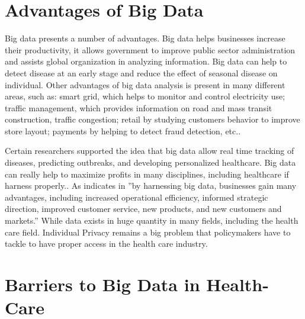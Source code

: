 \documentclass[sigconf]{acmart}
\begin{document}
\section{Advantages of Big Data}

Big data presents a number of advantages. Big data helps businesses increase their productivity, it allows government to improve public sector administration and assists global organization in analyzing information. Big data can help to detect disease at an early stage and reduce the effect of seasonal disease on individual. Other advantages of big data analysis is present in many different areas, such as:  smart grid, which helps to monitor and control electricity use; traffic management, which provides information on road and mass transit construction, traffic congestion; retail by studying customers behavior to improve store layout; payments by helping to detect fraud detection, etc.\cite{tene2012big}.

Certain researchers supported the idea that big data allow real time tracking of diseases, predicting outbreaks, and developing personalized healthcare. Big data can really help to maximize profits in many disciplines, including healthcare if harness properly.\cite{van2011health}. As indicates in \cite{khan2014big} ''by harnessing big data, businesses gain many advantages, including increased operational efficiency, informed strategic direction, improved customer service, new products, and new customers and markets.'' While data exists in huge quantity in many fields, including the health care field. Individual Privacy remains a big problem that policymakers have to tackle to have proper access in the health care industry.

\section{Barriers to Big Data in Health-Care}
\end{document}
